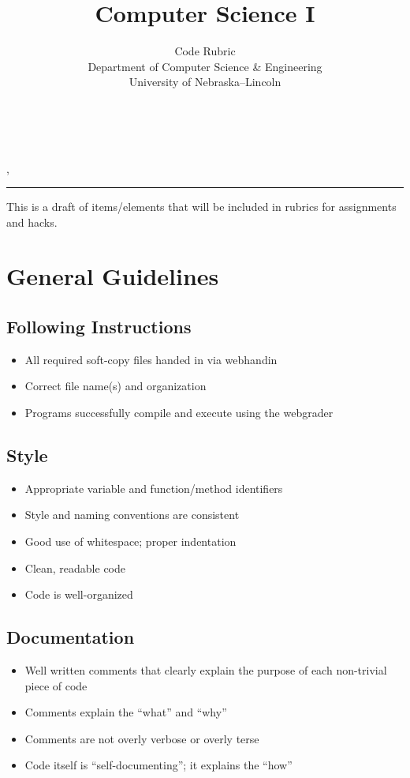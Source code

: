 \documentclass[12pt]{scrartcl}
\title{Computer Science I}\let\Title\@title
\subtitle{Code Rubric\\
{\small
\vskip1cm
Department of Computer Science \& Engineering \\
University of Nebraska--Lincoln}
\vskip-1cm}
\date{~}
\begin{document}
\maketitle

\newwatermark[allpages=true,scale=5,textmark=Draft\\Draft\\Draft\\Draft,color=gray!15,]{},

\hrule

This is a draft of items/elements that will be included in rubrics for
assignments and hacks.

\section*{General Guidelines}

\subsection*{Following Instructions}
\begin{itemize}
  \item All required soft-copy files handed in via webhandin
  \item Correct file name(s) and organization
  \item Programs successfully compile and execute using the webgrader
\end{itemize}

\subsection*{Style}
\begin{itemize}
  \item Appropriate variable and function/method identifiers
  \item Style and naming conventions are consistent
  \item Good use of whitespace; proper indentation
  \item Clean, readable code
  \item Code is well-organized
\end{itemize}

\subsection*{Documentation}
\begin{itemize}
  \item Well written comments that clearly explain the purpose of each non-trivial piece of code
  \item Comments explain the ``what'' and ``why''
  \item Comments are not overly verbose or overly terse
  \item Code itself is ``self-documenting''; it explains the ``how''
\end{itemize}
\end{document}
